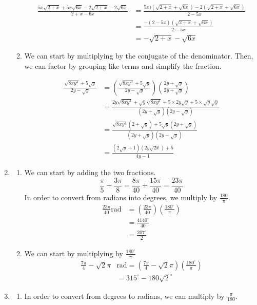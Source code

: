 \documentclass[11pt, letterpaper, twoside, tikz]{article}
\begin{document}
\begin{enumerate}
\begin{enumerate}[label=(\alph*)]
\begin{align*}
\frac{5x\sqrt{2+x}+5x\sqrt{6x}-2\sqrt{2+x}-2\sqrt{6x}}{2+x-6x} &= \frac{5x)(\sqrt{2+x}+\sqrt{6x})-2(\sqrt{2+x}+\sqrt{6x})}{2-5x}\\
&= \frac{-(2-5x)(\sqrt{2+x}+\sqrt{6x})}{2-5x}\\
&= -\sqrt{2+x}-\sqrt{6x}
\end{align*}

\item We can start by multiplying by the conjugate of the denominator. Then, we can factor by grouping like terms and simplify the fraction.

\begin{align*}
\frac{\sqrt{8xy^3}+5\sqrt{y}}{2y-\sqrt{y}}&= \left(\frac{\sqrt{8xy^3}+5\sqrt {y}}{2y-\sqrt{y}} \right)\left( \frac{2y+\sqrt{y}}{2y+\sqrt{y}}\right)\\
&= \frac{2y\sqrt{8xy^3}+\sqrt{y}\sqrt{8xy^3}+5\times 2y\sqrt{y}+5\times \sqrt{y}\sqrt{y}}{(2y+\sqrt{y})(2y-\sqrt{y})}\\
&= \frac{\sqrt{8xy^3}(2+\sqrt{y})+5\sqrt{y}(2y+\sqrt{y})}{(2y+\sqrt{y})(2y-\sqrt{y})}\\
&= \frac{(2\sqrt{y}+1)(2y\sqrt{2x})+5}{4y-1}
\end{align*}
\end{enumerate}
\item \begin{enumerate}[label=(\alph*)]
\item We can start by adding the two fractions.
$$\frac{\pi}{5}+\frac{3\pi}{8}=\frac{8\pi}{40}+\frac{15\pi}{40}=\frac{23\pi}{40}$$
In order to convert from radians into degrees, we multiply by $\frac{180}{\pi}$.
\begin{align*}
\frac{23\pi}{40}\text{rad}&=\left( \frac{23\pi}{40}\right)\left( \frac{180^{\circ}}{\pi}\right)\\
&=\frac{4140^{\circ}}{40}\\
&=\boxed{\frac{207^{\circ}}{2}}
\end{align*}

\item We can start by multiplying by $\frac{180^{\circ}}{\pi}$
\begin{align*}
\frac{7\pi}{4}-\sqrt2\pi&\text{rad}= \left( \frac{7\pi}{4}-\sqrt{2}\pi\right)\left(\frac{180^{\circ}}{\pi}\right)\\
&=315^{\circ}-180\sqrt{2}^{\circ}
\end{align*}
\end{enumerate}
\item \begin{enumerate}[label=(\alph*)]
\item In order to convert from degrees to radians, we can multiply by $\frac{\pi}{180}$.


\end{enumerate}
\end{enumerate}
\end{document}

